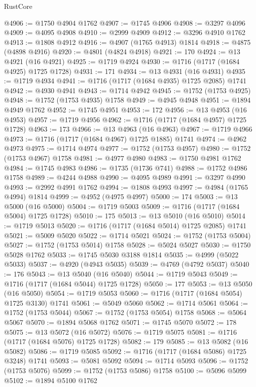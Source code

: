 \begin{lexlean}{RustCore}
\begin{coremodule}
@4906 := @1750 @4904 @1762
@4907 := @1745 @4906
@4908 := @3297 @4096
@4909 := @4095 @4908
@4910 := @2999 @4909
@4912 := @3296 @4910 @1762
@4913 := @1808 @4912
@4916 := @4907 (@1765 @4913) @1814
@4918 := @4875 (@4898 @4916)
@4920 := @4801 (@4824 @4918)
@4921 := 170
@4924 := @13 @4921 (@16 @4921)
@4925 := @1719 @4924
@4930 := @1716 (@1717 (@1684 @4925) @1725 @1728)
@4931 := 171
@4934 := @13 @4931 (@16 @4931)
@4935 := @1719 @4934
@4941 := @1716 (@1717 (@1684 @4935) @1725 @2085) @1741
@4942 := @4930 @4941
@4943 := @1714 @4942
@4945 := @1752 (@1753 @4925)
@4948 := @1752 (@1753 @4935) @1758
@4949 := @4945 @4948
@4951 := @1894 @4949 @1762
@4952 := @1745 @4951
@4953 := 172
@4956 := @13 @4953 (@16 @4953)
@4957 := @1719 @4956
@4962 := @1716 (@1717 (@1684 @4957) @1725 @1728)
@4963 := 173
@4966 := @13 @4963 (@16 @4963)
@4967 := @1719 @4966
@4973 := @1716 (@1717 (@1684 @4967) @1725 @1885) @1741
@4974 := @4962 @4973
@4975 := @1714 @4974
@4977 := @1752 (@1753 @4957)
@4980 := @1752 (@1753 @4967) @1758
@4981 := @4977 @4980
@4983 := @1750 @4981 @1762
@4984 := @1745 @4983
@4986 := @1735 (@1736 @741)
@4988 := @1752 @4986 @1758
@4989 := @4244 @4988
@4990 := @4095 @4989
@4991 := @3297 @4990
@4993 := @2992 @4991 @1762
@4994 := @1808 @4993
@4997 := @4984 (@1765 @4994) @1814
@4999 := @4952 (@4975 @4997)
@5000 := 174
@5003 := @13 @5000 (@16 @5000)
@5004 := @1719 @5003
@5009 := @1716 (@1717 (@1684 @5004) @1725 @1728)
@5010 := 175
@5013 := @13 @5010 (@16 @5010)
@5014 := @1719 @5013
@5020 := @1716 (@1717 (@1684 @5014) @1725 @2085) @1741
@5021 := @5009 @5020
@5022 := @1714 @5021
@5024 := @1752 (@1753 @5004)
@5027 := @1752 (@1753 @5014) @1758
@5028 := @5024 @5027
@5030 := @1750 @5028 @1762
@5033 := @1745 @5030 @3188 @1814
@5035 := @4999 (@5022 @5033)
@5037 := @4920 (@4943 @5035)
@5039 := @4769 (@4792 @5037)
@5040 := 176
@5043 := @13 @5040 (@16 @5040)
@5044 := @1719 @5043
@5049 := @1716 (@1717 (@1684 @5044) @1725 @1728)
@5050 := 177
@5053 := @13 @5050 (@16 @5050)
@5054 := @1719 @5053
@5060 := @1716 (@1717 (@1684 @5054) @1725 @3130) @1741
@5061 := @5049 @5060
@5062 := @1714 @5061
@5064 := @1752 (@1753 @5044)
@5067 := @1752 (@1753 @5054) @1758
@5068 := @5064 @5067
@5070 := @1894 @5068 @1762
@5071 := @1745 @5070
@5072 := 178
@5075 := @13 @5072 (@16 @5072)
@5076 := @1719 @5075
@5081 := @1716 (@1717 (@1684 @5076) @1725 @1728)
@5082 := 179
@5085 := @13 @5082 (@16 @5082)
@5086 := @1719 @5085
@5092 := @1716 (@1717 (@1684 @5086) @1725 @3248) @1741
@5093 := @5081 @5092
@5094 := @1714 @5093
@5096 := @1752 (@1753 @5076)
@5099 := @1752 (@1753 @5086) @1758
@5100 := @5096 @5099
@5102 := @1894 @5100 @1762

\end{coremodule}
\end{lexlean}
